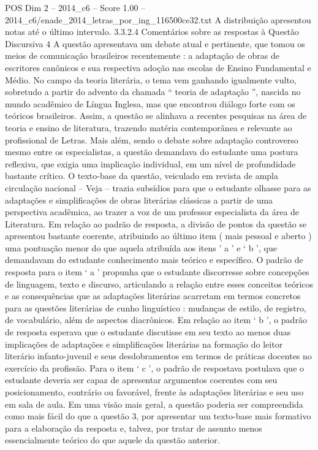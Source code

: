 \begin{textsample}{POS Dim 2 – 2014\_c6 – Score 1.00 – 2014\_c6/enade\_2014\_letras\_por\_ing\_116500ce32.txt}
A distribuição apresentou notas até o último intervalo. 3.3.2.4 Comentários sobre as respostas à Questão Discursiva 4 A questão apresentava um debate atual e pertinente, que tomou os meios de comunicação brasileiros recentemente : a adaptação de obras de escritores canônicos e sua respectiva adoção nas escolas de Ensino Fundamental e Médio.
No campo da teoria literária, o tema vem ganhando igualmente vulto, sobretudo a partir do advento da chamada “ teoria de adaptação ”, nascida no mundo acadêmico de Língua Inglesa, mas que encontrou diálogo forte com os teóricos brasileiros.
Assim, a questão se alinhava a recentes pesquisas na área de teoria e ensino de literatura, trazendo matéria contemporânea e relevante ao profissional de Letras.
Mais além, sendo o debate sobre adaptação controverso mesmo entre os especialistas, a questão demandava do estudante uma postura reflexiva, que exigia uma implicação individual, em um nível de profundidade bastante crítico.
O texto-base da questão, veiculado em revista de ampla circulação nacional – Veja – trazia subsídios para que o estudante olhasse para as adaptações e simplificações de obras literárias clássicas a partir de uma perspectiva acadêmica, ao trazer a voz de um professor especialista da área de Literatura.
Em relação ao padrão de resposta, a divisão de pontos da questão se apresentou bastante coerente, atribuindo ao último item ( mais pessoal e aberto ) uma pontuação menor do que aquela atribuída aos itens ’ a ’ e ‘ b ’, que demandavam do estudante conhecimento mais teórico e específico.
O padrão de resposta para o item ‘ a ’ propunha que o estudante discorresse sobre concepções de linguagem, texto e discurso, articulando a relação entre esses conceitos teóricos e as consequências que as adaptações literárias acarretam em termos concretos para as questões literárias de cunho linguístico : mudanças de estilo, de registro, de vocabulário, além de aspectos diacrônicos.
Em relação ao item ‘ b ’, o padrão de resposta esperava que o estudante discutisse em seu texto ao menos duas implicações de adaptações e simplificações literárias na formação do leitor literário infanto-juvenil e seus desdobramentos em termos de práticas docentes no exercício da profissão.
Para o item ‘ c ’, o padrão de respostava postulava que o estudante deveria ser capaz de apresentar argumentos coerentes com seu posicionamento, contrário ou favorável, frente às adaptações literárias e seu uso em sala de aula.
Em uma visão mais geral, a questão poderia ser compreendida como mais fácil do que a questão 3, por apresentar um texto-base mais formativo para a elaboração da resposta e, talvez, por tratar de assunto menos essencialmente teórico do que aquele da questão anterior.

\end{textsample}
